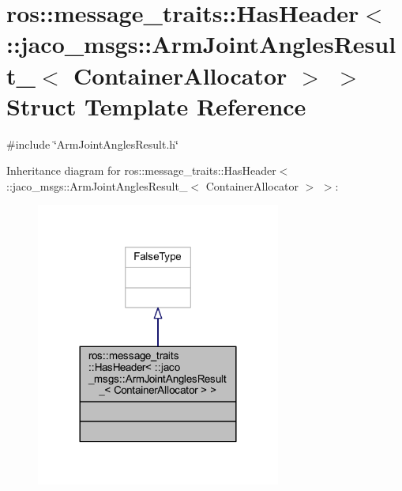 \hypertarget{structros_1_1message__traits_1_1HasHeader_3_01_1_1jaco__msgs_1_1ArmJointAnglesResult___3_01ContainerAllocator_01_4_01_4}{}\section{ros\+:\+:message\+\_\+traits\+:\+:Has\+Header$<$ \+:\+:jaco\+\_\+msgs\+:\+:Arm\+Joint\+Angles\+Result\+\_\+$<$ Container\+Allocator $>$ $>$ Struct Template Reference}
\label{structros_1_1message__traits_1_1HasHeader_3_01_1_1jaco__msgs_1_1ArmJointAnglesResult___3_01ContainerAllocator_01_4_01_4}


{\ttfamily \#include \char`\"{}Arm\+Joint\+Angles\+Result.\+h\char`\"{}}



Inheritance diagram for ros\+:\+:message\+\_\+traits\+:\+:Has\+Header$<$ \+:\+:jaco\+\_\+msgs\+:\+:Arm\+Joint\+Angles\+Result\+\_\+$<$ Container\+Allocator $>$ $>$\+:
\nopagebreak
\begin{figure}[H]
\begin{center}
\leavevmode
\includegraphics[width=228pt]{db/dc0/structros_1_1message__traits_1_1HasHeader_3_01_1_1jaco__msgs_1_1ArmJointAnglesResult___3_01Conta2597e60a188fb38b3c4c408278efd9f0}
\end{center}
\end{figure}


